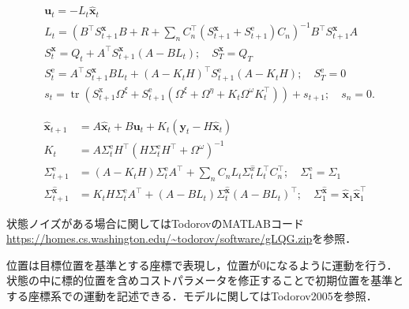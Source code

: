\begin{align}
&\mathbf{u}_{t}=-L_{t} \hat{\mathbf{x}}_{t} \\
&L_{t}=\left(B^\top S_{t+1}^{\mathbf{x}} B+R+\sum_{n} C_{n}^\top\left(S_{t+1}^{\mathbf{x}}+S_{t+1}^{\mathrm{e}}\right) C_{n}\right)^{-1} B^\top S_{t+1}^{\mathbf{x}} A \\
&S_{t}^{\mathbf{x}}=Q_{t}+A^\top S_{t+1}^{\mathbf{x}}\left(A-B L_{t}\right) ; \quad S_{T}^{\mathbf{x}}=Q_{T} \\
&S_{t}^{\mathrm{e}}=A^\top S_{t+1}^{\mathbf{x}} B L_t+\left(A-K_{t} H\right)^\top S_{t+1}^{\mathrm{e}}\left(A-K_{t} H\right) ; \quad S_{T}^{\mathrm{e}}=0\\
&s_{t}=\operatorname{tr}\left(S_{t+1}^{\mathrm{x}}\Omega^{\xi}+S_{t+1}^{\mathrm{e}}\left(\Omega^{\xi}+\Omega^{\eta}+K_{t} \Omega^{\omega} K_{t}^{\top}\right)\right)+s_{t+1} ; \quad s_{n}=0 .
\end{align}



\begin{align}
\hat{\mathbf{x}}_{t+1} &=A \hat{\mathbf{x}}_{t}+B \mathbf{u}_{t}+K_{t}\left(\mathbf{y}_{t}-H \hat{\mathbf{x}}_{t}\right) \\
K_{t} &=A \Sigma_{t}^{\mathrm{e}} H^\top\left(H \Sigma_{t}^{\mathrm{e}} H^\top+\Omega^{\omega}\right)^{-1} \\
\Sigma_{t+1}^{\mathrm{e}} &=\left(A-K_{t} H\right) \Sigma_{t}^{\mathrm{e}} A^\top+\sum_{n} C_{n} L_{t} \Sigma_{t}^{\hat{x}} L_{t}^\top C_{n}^\top ; \quad \Sigma_{1}^{\mathrm{e}}=\Sigma_{1} \\
\Sigma_{t+1}^{\hat{\mathbf{x}}} &=K_{t} H \Sigma_{t}^{\mathrm{e}} A^\top+\left(A-B L_{t}\right) \Sigma_{t}^{\hat{\mathbf{x}}}\left(A-B L_{t}\right)^\top ; \quad \Sigma_{1}^{\hat{\mathbf{x}}}=\hat{\mathbf{x}}_{1} \hat{\mathbf{x}}_{1}^\top
\end{align}

状態ノイズがある場合に関してはTodorovのMATLABコード \url{https://homes.cs.washington.edu/~todorov/software/gLQG.zip}を参照．

位置は目標位置を基準とする座標で表現し，位置が0になるように運動を行う．状態の中に標的位置を含めコストパラメータを修正することで初期位置を基準とする座標系での運動を記述できる．モデルに関してはTodorov2005を参照．







